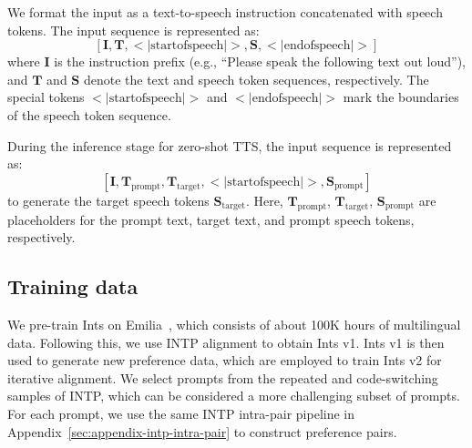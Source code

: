\documentclass[11pt]{article}
\begin{document}
We format the input as a text-to-speech instruction concatenated with speech tokens. The input sequence is represented as: 
\[
\left[\boldsymbol{I}, \boldsymbol{T}, <|\text{startofspeech}|>, \boldsymbol{S}, <|\text{endofspeech}|> \right]
\]
where \(\boldsymbol{I}\) is the instruction prefix (e.g., ``Please speak the following text out loud''), and \(\boldsymbol{T}\) and \(\boldsymbol{S}\) denote the text and speech token sequences, respectively. The special tokens \(<|\text{startofspeech}|>\) and \(<|\text{endofspeech}|>\) mark the boundaries of the speech token sequence.

During the inference stage for zero-shot TTS, the input sequence is represented as:
\[
\left[\boldsymbol{I}, \boldsymbol{T}_{\text{prompt}}, \boldsymbol{T}_{\text{target}}, <|\text{startofspeech}|>, \boldsymbol{S}_{\text{prompt}} \right]
\]
to generate the target speech tokens \(\boldsymbol{S}_{\text{target}}\). Here, \(\boldsymbol{T}_{\text{prompt}}\), \(\boldsymbol{T}_{\text{target}}\), \(\boldsymbol{S}_{\text{prompt}}\) are placeholders for the prompt text, target text, and prompt speech tokens, respectively.

\subsection{Training data}\label{sec:appendix-ints-training-data}

We pre-train Ints on Emilia~\cite{emilia}, which consists of about 100K hours of multilingual data. Following this, we use INTP alignment to obtain Ints v1. Ints v1 is then used to generate new preference data, which are employed to train Ints v2 for iterative alignment. We select prompts from the repeated and code-switching samples of INTP, which can be considered a more challenging subset of prompts. For each prompt, we use the same INTP intra-pair pipeline in Appendix~\ref{sec:appendix-intp-intra-pair} to construct preference pairs.
\end{document}
